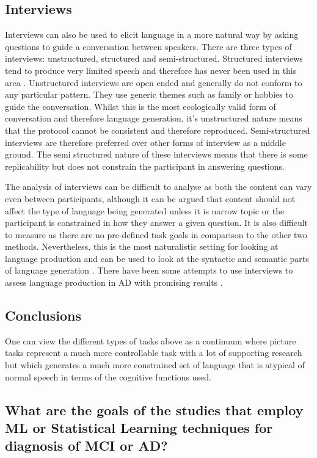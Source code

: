\subsection{Interviews}
Interviews can also be used to elicit language in a more natural way by asking questions to guide a conversation between speakers. There are three types of interviews: unstructured, structured and semi-structured. Structured interviews tend to produce very limited speech and therefore has never been used in this area \cite{Boschi2017}. Unstructured interviews are open ended and generally do not conform to any particular pattern. They use generic themes such as family or hobbies to guide the conversation. Whilst this is the most ecologically valid form of conversation and therefore language generation, it's unstructured nature means that the protocol cannot be consistent and therefore reproduced. Semi-structured interviews are therefore preferred over other forms of interview as a middle ground. The semi structured nature of these interviews means that there is some replicability but does not constrain the participant in answering questions.
\par
The analysis of interviews can be difficult to analyse as both the content can vary even between participants, although it can be argued that content should not affect the type of language being generated unless it is narrow topic or the participant is constrained in how they answer a given question. It is also difficult to measure as there are no pre-defined task goals in comparison to the other two methods. Nevertheless, this is the most naturalistic setting for looking at language production and can be used to look at the syntactic and semantic parts of language generation \cite{Sajjadi2012}. There have been some attempts to use interviews to assess language production in AD with promising results \cite{Asgari2017, Guinn2015}.
\par
\subsection{Conclusions}
One can view the different types of tasks above as a continuum where picture tasks represent a much more controllable task with a lot of supporting research but which generates a much more constrained set of language that is atypical of normal speech in terms of the cognitive functions used. 


\subsection{What are the goals of the studies that employ ML or Statistical Learning techniques for diagnosis of MCI or AD?}

